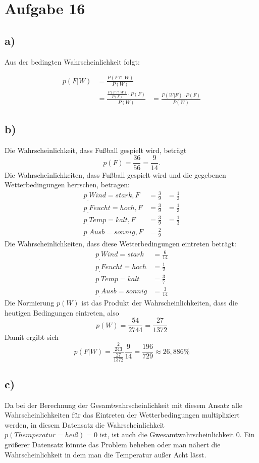 \section{Aufgabe 16}
\label{sec:Aufgabe3}
\subsection*{a)}
Aus der bedingten Wahrscheinlichkeit folgt:

\begin{align*}
p(F|W) &= \frac{P(F\cap\ W)}{P(W)}\\
 &= \frac{\frac{P(F\,\cap\, W)}{P(F)}\cdot P(F)}{P(W)}
 &= \frac{P(W|F)\cdot P(F)}{P(W)}
\end{align*}

\subsection*{b)}
Die Wahrscheinlichkeit, dass Fußball gespielt wird, beträgt
\[
p(F) = \frac{36}{56} = \frac{9}{14} \text{.}
\]
Die Wahrscheinlichkeiten, dass Fußball gespielt wird und die gegebenen Wetterbedingungen herrschen, betragen:
\begin{align*}
p_.{Wind = stark, F} &= \frac{3}{9} &= \frac{1}{3}\\
p_.{Feucht = hoch, F} &= \frac{3}{9} &= \frac{1}{3}\\
p_.{Temp = kalt, F} &= \frac{3}{9} &= \frac{1}{3}\\
p_.{Ausb = sonnig, F} &= \frac{2}{9}
\end{align*}
Die Wahrscheinlichkeiten, dass diese Wetterbedingungen eintreten beträgt:
\begin{align*}
p_.{Wind = stark} &= \frac{6}{14}\\
p_.{Feucht = hoch} &= \frac{1}{2}\\
p_.{Temp = kalt} &= \frac{3}{7}\\
p_.{Ausb = sonnig} &= \frac{3}{14}
\end{align*}
Die Normierung $p(W)$ ist das Produkt der Wahrscheinlichkeiten, dass die heutigen Bedingungen eintreten, also 
\[
p(W) = \frac{54}{2744} = \frac{27}{1372}
\]
Damit ergibt sich
\[
p(F|W) = \frac{\frac{2}{243}}{\frac{27}{1372}}\frac{9}{14}= \frac{196}{729}\approx 26,886\si{\percent}
\]

\subsection*{c)}
Da bei der Berechnung der Gesamtwahrscheinlichkeit mit diesem Ansatz alle Wahrscheinlichkeiten für das Eintreten der Wetterbedingungen multipliziert werden, in diesem Datensatz die Wahrscheinlichkeit $p(Themperatur = heiß) = 0$ ist, ist auch die Gwesamtwahrscheinlichkeit $0$.
Ein größerer Datensatz könnte das Problem beheben oder man nähert die Wahrscheinlichkeit in dem man die Temperatur außer Acht lässt.

